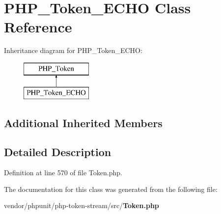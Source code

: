 \section{P\+H\+P\+\_\+\+Token\+\_\+\+E\+C\+H\+O Class Reference}
\label{class_p_h_p___token___e_c_h_o}
Inheritance diagram for P\+H\+P\+\_\+\+Token\+\_\+\+E\+C\+H\+O\+:\begin{figure}[H]
\begin{center}
\leavevmode
\includegraphics[height=2.000000cm]{class_p_h_p___token___e_c_h_o}
\end{center}
\end{figure}
\subsection*{Additional Inherited Members}


\subsection{Detailed Description}


Definition at line 570 of file Token.\+php.



The documentation for this class was generated from the following file\+:\begin{DoxyCompactItemize}
\item 
vendor/phpunit/php-\/token-\/stream/src/{\bf Token.\+php}\end{DoxyCompactItemize}
